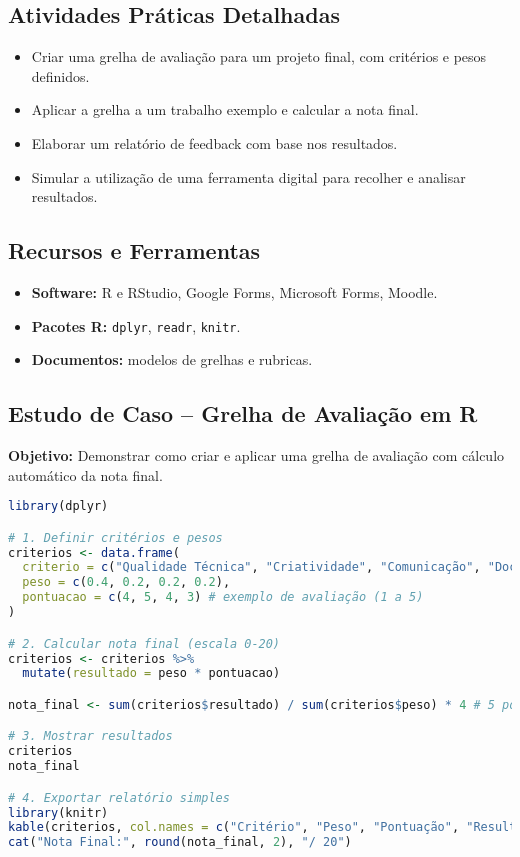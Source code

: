 \subsection{\textcolor{subsectionblue}{Atividades Práticas Detalhadas}}
\begin{itemize}
  \item Criar uma grelha de avaliação para um projeto final, com critérios e pesos definidos.
  \item Aplicar a grelha a um trabalho exemplo e calcular a nota final.
  \item Elaborar um relatório de feedback com base nos resultados.
  \item Simular a utilização de uma ferramenta digital para recolher e analisar resultados.
\end{itemize}

\subsection{\textcolor{subsectionblue}{Recursos e Ferramentas}}
\begin{itemize}
  \item \textbf{Software:} R e RStudio, Google Forms, Microsoft Forms, Moodle.
  \item \textbf{Pacotes R:} \texttt{dplyr}, \texttt{readr}, \texttt{knitr}.
  \item \textbf{Documentos:} modelos de grelhas e rubricas.
\end{itemize}

\subsection{\textcolor{subsectionblue}{Estudo de Caso – Grelha de Avaliação em R}}
\textbf{Objetivo:} Demonstrar como criar e aplicar uma grelha de avaliação com cálculo automático da nota final.

\begin{lstlisting}[language=R]
library(dplyr)

# 1. Definir critérios e pesos
criterios <- data.frame(
  criterio = c("Qualidade Técnica", "Criatividade", "Comunicação", "Documentação"),
  peso = c(0.4, 0.2, 0.2, 0.2),
  pontuacao = c(4, 5, 4, 3) # exemplo de avaliação (1 a 5)
)

# 2. Calcular nota final (escala 0-20)
criterios <- criterios %>%
  mutate(resultado = peso * pontuacao)

nota_final <- sum(criterios$resultado) / sum(criterios$peso) * 4 # 5 pontos = 20 valores

# 3. Mostrar resultados
criterios
nota_final

# 4. Exportar relatório simples
library(knitr)
kable(criterios, col.names = c("Critério", "Peso", "Pontuação", "Resultado"))
cat("Nota Final:", round(nota_final, 2), "/ 20")
\end{lstlisting}

